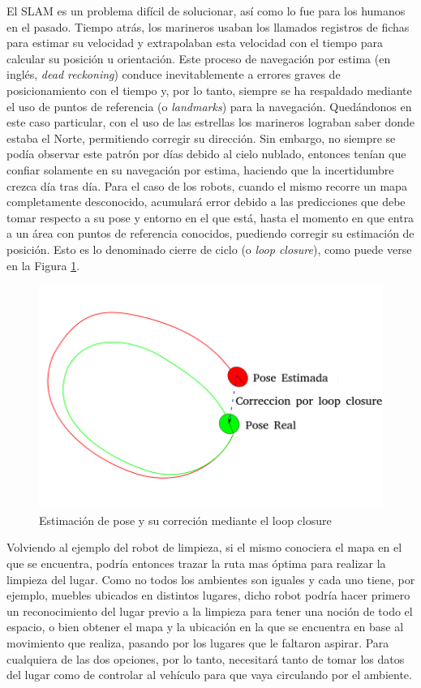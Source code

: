 El SLAM es un problema difícil de solucionar, así como lo fue para los humanos en el pasado. Tiempo atrás, los marineros usaban los llamados registros de fichas para estimar su velocidad y extrapolaban esta velocidad con el tiempo para calcular su posición u orientación. Este proceso de navegación por estima (en inglés, \textit{dead reckoning}) conduce inevitablemente a errores graves de posicionamiento con el tiempo y, por lo tanto, siempre se ha respaldado mediante el uso de puntos de referencia (o \textit{landmarks}) para la navegación. Quedándonos en este caso particular, con el uso de las estrellas los marineros lograban saber donde estaba el Norte, permitiendo corregir su dirección. Sin embargo, no siempre se podía observar este patrón por días debido al cielo nublado, entonces tenían que confiar solamente en su navegación por estima, haciendo que la incertidumbre crezca día tras día. Para el caso de los robots, cuando el mismo recorre un  mapa completamente desconocido, acumulará error debido a las predicciones que debe tomar respecto a su pose y entorno en el que está, hasta el momento en que entra a un área con puntos de referencia conocidos, puediendo corregir su estimación de posición. Esto es lo denominado cierre de ciclo (o \textit{loop closure}), como puede verse en la Figura \ref{fig:poseloopclcorr}.

\begin{figure}
    \centering
    \includegraphics[width=\textwidth]{Img/Pose_LoopClosureCorr.png}
    \caption{Estimación de pose y su correción mediante el loop closure}
    \label{fig:poseloopclcorr}
\end{figure}

Volviendo al ejemplo del robot de limpieza, si el mismo conociera el mapa en el que se encuentra, podría entonces trazar la ruta mas óptima para realizar la limpieza del lugar. Como no todos los ambientes son iguales y cada uno tiene, por ejemplo, muebles ubicados en distintos lugares, dicho robot podría hacer primero un reconocimiento del lugar previo a la limpieza para tener una noción de todo el espacio, o bien obtener el mapa y la ubicación en la que se encuentra en base al movimiento que realiza, pasando por los lugares que le faltaron aspirar. Para cualquiera de las dos opciones, por lo tanto, necesitará tanto de tomar los datos del lugar como de controlar al vehículo para que vaya circulando por el ambiente.

